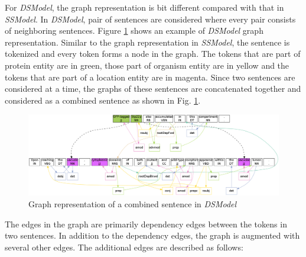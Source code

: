 
For \textit{DSModel}, the graph representation is bit different compared with that in \textit{SSModel}. In \textit{DSModel}, pair of sentences are considered where every pair consists of neighboring sentences. Figure \ref{fig:DSGraph} shows an example of \textit{DSModel} graph representation. Similar to the graph representation in \textit{SSModel}, the sentence is tokenized and every token forms a node in the graph. The tokens that are part of protein entity are in green, those part of organism entity are in yellow and the tokens that are part of a location entity are in magenta. Since two sentences are considered at a time, the graphs of these sentences are concatenated together and considered as a combined sentence as shown in Fig. \ref{fig:DSGraph}.

\begin{figure}
\centering
\includegraphics[scale=0.3]{figures/DiffSentenceGraph.png}
\caption{Graph representation of a combined sentence in \textit{DSModel}}\label{fig:DSGraph}
\end{figure}


The edges in the graph are primarily dependency edges between the tokens in two sentences. In addition to the dependency edges, the graph is augmented with several other edges. The additional edges are described as follows:

